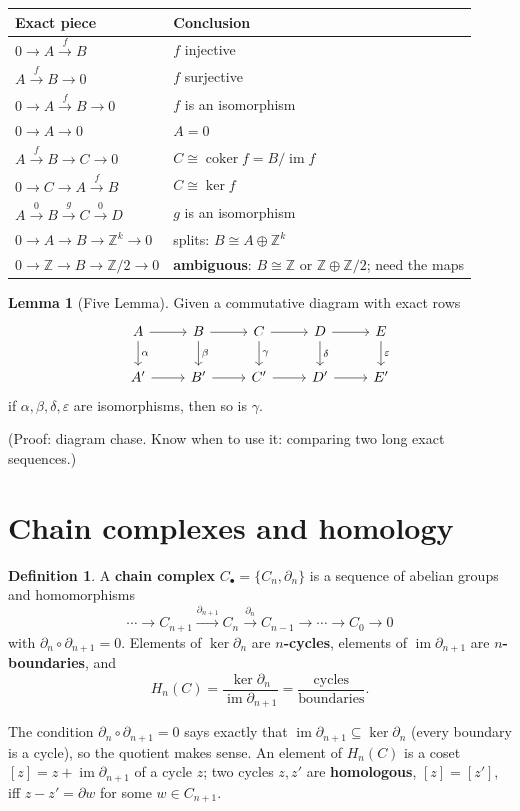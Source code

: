 \documentclass[11pt]{article}
\newcommand{\Z}{\mathbb Z}
\newcommand{\im}{\operatorname{im}}
\newcommand{\coker}{\operatorname{coker}}
\theoremstyle{definition}
\newtheorem{lem}[thm]{Lemma}
\newtheorem{defn}[thm]{Definition}
\begin{document}
\begin{center}
\renewcommand{\arraystretch}{1.3}
\begin{tabular}{ll}
\toprule
Exact piece & Conclusion\\
\midrule
$0\to A\xrightarrow{f}B$ & $f$ injective\\
$A\xrightarrow{f}B\to0$ & $f$ surjective\\
$0\to A\xrightarrow{f}B\to0$ & $f$ is an isomorphism\\
$0\to A\to0$ & $A=0$\\
$A\xrightarrow{f}B\to C\to0$ & $C\cong\coker f=B/\im f$\\
$0\to C\to A\xrightarrow{f}B$ & $C\cong\ker f$\\
$A\xrightarrow{0}B\xrightarrow{g}C\xrightarrow{0}D$ & $g$ is an isomorphism\\
$0\to A\to B\to\Z^k\to0$ & splits: $B\cong A\oplus\Z^k$\\
$0\to\Z\to B\to\Z/2\to0$ & \textbf{ambiguous}: $B\cong\Z$ or $\Z\oplus\Z/2$; need the maps\\
\bottomrule
\end{tabular}
\end{center}

\begin{lem}[Five Lemma]
Given a commutative diagram with exact rows
\[\begin{tikzcd}
A\ar[r]\ar[d,"\alpha"] & B\ar[r]\ar[d,"\beta"] & C\ar[r]\ar[d,"\gamma"] & D\ar[r]\ar[d,"\delta"] & E\ar[d,"\varepsilon"]\\
A'\ar[r] & B'\ar[r] & C'\ar[r] & D'\ar[r] & E'
\end{tikzcd}\]
if $\alpha,\beta,\delta,\varepsilon$ are isomorphisms, then so is $\gamma$.
\end{lem}
(Proof: diagram chase. Know when to use it: comparing two long exact sequences.)

\section{Chain complexes and homology}

\begin{defn}
A \textbf{chain complex} $C_\bullet=\{C_n,\partial_n\}$ is a sequence of abelian groups and homomorphisms
\[\cdots\to C_{n+1}\xrightarrow{\partial_{n+1}}C_n\xrightarrow{\partial_n}C_{n-1}\to\cdots\to C_0\to0\]
with $\partial_n\circ\partial_{n+1}=0$. Elements of $\ker\partial_n$ are \textbf{$n$-cycles}, elements of $\im\partial_{n+1}$ are \textbf{$n$-boundaries}, and
\[H_n(C)=\frac{\ker\partial_n}{\im\partial_{n+1}}=\frac{\text{cycles}}{\text{boundaries}}.\]
\end{defn}
The condition $\partial_n\circ\partial_{n+1}=0$ says exactly that $\im\partial_{n+1}\subseteq\ker\partial_n$ (every boundary is a cycle), so the quotient makes sense. An element of $H_n(C)$ is a coset $[z]=z+\im\partial_{n+1}$ of a cycle $z$; two cycles $z,z'$ are \textbf{homologous}, $[z]=[z']$, iff $z-z'=\partial w$ for some $w\in C_{n+1}$.
\end{document}
